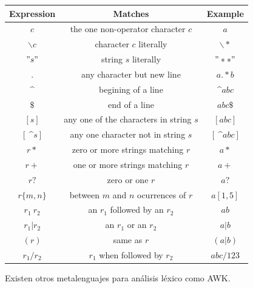 \begin{table}[H]
\begin{tabular}{c|c|c}
Expression                  & Matches                                & Example          \\ \hline
$c$                         & the one non-operator character $c$     & $a$              \\
$\backslash{}c$             & character $c$ literally                & $\backslash{}*$  \\
$"s"$                       & string $s$ literally                   & $"**"$           \\
$.$                         & any character but new line             & $a.*b$           \\
$\^{}$                      & begining of a line                     & $\^{}abc$        \\
$\$$                        & end of a line                          & $abc\$$          \\
$[s]$                       & any one of the characters in string $s$& $[abc]$          \\
$[\:\^{}s]$                 & any one character not in string $s$    & $[\:\^{}abc]$    \\
$r*$                        & zero or more strings matching $r$      & $a*$             \\
$r+$                        & one or more strings matching $r$       & $a+$             \\
$r?$                        & zero or one $r$                        & $a?$             \\
$r\{m,n\}$                  & between $m$ and $n$ ocurrences of $r$  & $a[1,5]$         \\
$r_1 \: r_2$                & an $r_1$ followed by an $r_2$          & $ab$             \\
$r_1 \vert r_2$             & an $r_1$ or an $r_2$                   & $a\vert b$       \\
$(r)$                       & same as $r$                            & $(a\vert b)$     \\
$r_1 / r_2$                 & $r_1$ when followed by $r_2$           & $abc/123$        \\
\end{tabular}
\end{table}

Existen otros metalenguajes para análisis léxico como AWK.\\


